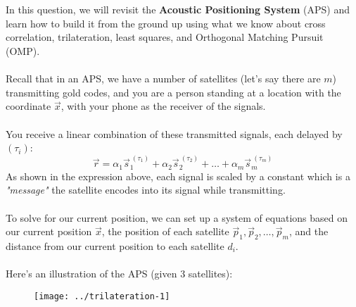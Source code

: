 \\ \\
In this question, we will revisit the \textbf{Acoustic Positioning System} (APS) and learn how to build it from the ground up using what we know about cross correlation, trilateration, least squares, and Orthogonal Matching Pursuit (OMP).
\\ \\
Recall that in an APS, we have a number of satellites (let's say there are $m$) transmitting gold codes, and you are a person standing at a location with the coordinate $\vec{x}$, with your phone as the receiver of the signals.
\\ \\
You receive a linear combination of these transmitted signals, each delayed by $(\tau_i)$:
$$\vec{r} = \alpha_1 \vec{s}_1^{\ (\tau_1)} + \alpha_2 \vec{s}_2^{\ (\tau_2)} + \hdots + \alpha_m \vec{s}_m^{\ (\tau_m)}$$
As shown in the expression above, each signal is scaled by a constant which is a \textit{"message"} the satellite encodes into its signal while transmitting.
\\ \\
To solve for our current position, we can set up a system of equations based on our current position $\vec{x}$, the position of each satellite $\vec{p}_1, \vec{p}_2, \hdots, \vec{p}_m$, and the distance from our current position to each satellite $d_i$.
\\ \\
Here's an illustration of the APS (given 3 satellites):
\begin{figure}[H]
    \centering
    \texttt{[image: ../trilateration-1]}
\end{figure}

